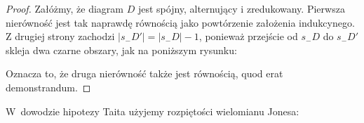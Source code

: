 \begin{proof}
    Załóżmy, że diagram $D$ jest spójny, alternujący i zredukowany.
    Pierwsza nierówność jest tak naprawdę równością jako powtórzenie założenia indukcynego.
    Z drugiej strony zachodzi $|s_-D'|=|s_-D|-1$, ponieważ przejście od $s_-D$ do $s_-D'$ skleja dwa czarne obszary, jak na poniższym rysunku:
\begin{comment}
    \[
        \begin{tikzpicture}[baseline=-0.65ex,scale=0.20]
        \begin{knot}[clip width=5]
            \strand[semithick] (-5, 0) to (5, 0);
            \strand[semithick] (0, -5) to (0, 5);
            \draw[fill=blue!10!white,draw=none] (-5, -5) rectangle (0, 0);
            \draw[fill=blue!10!white,draw=none] ( 5,  5) rectangle (0, 0);
            \node at (0, -8) {$D$};
        \end{knot}
        \end{tikzpicture}
        \quad
        \begin{tikzpicture}[baseline=-0.65ex,scale=0.20]
            \draw[fill=blue!10!white, draw=none] (-5, 0) -- (-2, 0) [in=up, out=right] to (0, -2) -- (0, -5) -- (-5, -5);
            \draw[fill=blue!10!white, draw=none] (5, 0) -- (2, 0) [in=down, out=left] to (0, 2) -- (0, 5) -- (5, 5);
            \draw[semithick] (-5, 0) -- (-2, 0) [in=up, out=right] to (0, -2) -- (0, -5);
            \draw[semithick] (5, 0) -- (2, 0) [in=down, out=left] to (0, 2) -- (0, 5);
            \node at (0, -8) {$s_-D$};
        \end{tikzpicture}
        \quad
        \begin{tikzpicture}[baseline=-0.65ex,scale=0.20]
            \draw[fill=blue!10!white, draw=none] (-5, -5) rectangle (5, 5);
            \draw[fill=white, draw=none] (5, 0) -- (2, 0) [in=up, out=left] to (0, -2) -- (0, -5) -- (5, -5);
            \draw[fill=white, draw=none] (-5, 0) -- (-2, 0) [in=down, out=right] to (0, 2) -- (0, 5) -- (-5, 5);
            \draw[semithick] (5, 0) -- (2, 0) [in=up, out=left] to (0, -2) -- (0, -5);
            \draw[semithick] (-5, 0) -- (-2, 0) [in=down, out=right] to (0, 2) -- (0, 5);
            \node at (0, -8) {$s_-D'$};
        \end{tikzpicture}
    \]
\end{comment}
    Oznacza to, że druga nierówność także jest równością, quod erat demonstrandum.
    \end{proof}

W~dowodzie hipotezy Taita użyjemy rozpiętości wielomianu Jonesa:

